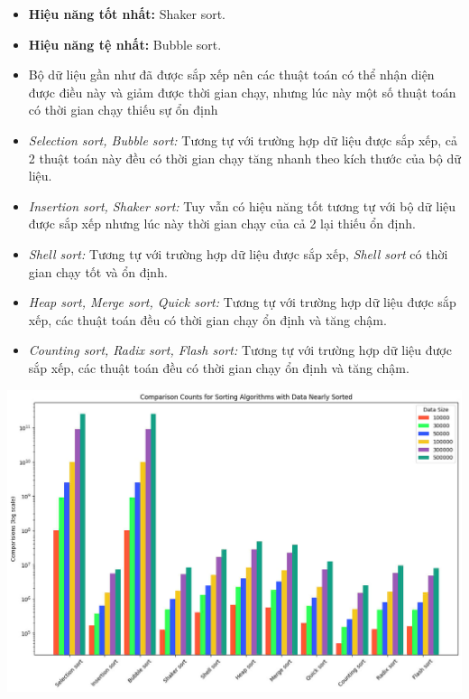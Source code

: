         \begin{itemize}
            \item \textbf{Hiệu năng tốt nhất:} Shaker sort.
            \item \textbf{Hiệu năng tệ nhất:} Bubble sort.
            \item Bộ dữ liệu gần như đã được sắp xếp nên các thuật toán có thể nhận diện được điều này và giảm được thời gian chạy, nhưng lúc này một số thuật toán có thời gian chạy thiếu sự ổn định
            \item \textit{Selection sort, Bubble sort: } Tương tự với trường hợp dữ liệu được sắp xếp, cả 2 thuật toán này đều có thời gian chạy tăng nhanh theo kích thước của bộ dữ liệu.
            \item \textit{Insertion sort, Shaker sort: } Tuy vẫn có hiệu năng tốt tương tự với bộ dữ liệu được sắp xếp nhưng lúc này thời gian chạy của cả 2 lại thiếu ổn định.
            \item \textit{Shell sort: } Tương tự với trường hợp dữ liệu được sắp xếp, \textit{Shell sort} có thời gian chạy tốt và ổn định.
            \item \textit{Heap sort, Merge sort, Quick sort:} Tương tự với trường hợp dữ liệu được sắp xếp, các thuật toán đều có thời gian chạy ổn định và tăng chậm.
            \item \textit{Counting sort, Radix sort, Flash sort:} Tương tự với trường hợp dữ liệu được sắp xếp, các thuật toán đều có thời gian chạy ổn định và tăng chậm.
    \end{itemize}

    \newpage
    \includegraphics[width = 1\linewidth]{img/experiment/comparison/COMPARISON_NEARLY.jpg}
